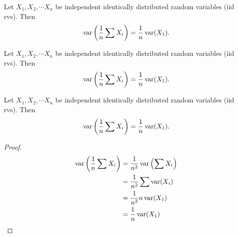 \begin{note}
  \begin{field}
    \begin{cor}
     Let $X_1, X_2, \cdots X_n$ be independent identically distributed random variables (iid rvs). Then
     \[
       \operatorname{var}\left(\frac{1}{n}\sum X_i\right) = \frac{1}{n}\operatorname{var} (X_1).
     \]
    \end{cor}
  \end{field}
  \begin{field}
    \begin{cor}
     Let $X_1, X_2, \cdots X_n$ be independent identically distributed random variables (iid rvs). Then
     \[
       \operatorname{var}\left(\frac{1}{n}\sum X_i\right) = \frac{1}{n}\operatorname{var} (X_1).
     \]
    \end{cor}
  \end{field}
  \xplain{}%
\end{note}

%
\begin{note}
  \begin{field}
    \begin{cor}
     Let $X_1, X_2, \cdots X_n$ be independent identically distributed random variables (iid rvs). Then
     \[
       \operatorname{var}\left(\frac{1}{n}\sum X_i\right) = \frac{1}{n}\operatorname{var} (X_1).
     \]
    \end{cor}
  \end{field}
  \begin{field}
    \begin{proof}
      \begin{align*}
        \operatorname{var}\left(\frac{1}{n}\sum X_i\right) &= \frac{1}{n^2}\operatorname{var}\left(\sum X_i\right)\\
        &= \frac{1}{n^2}\sum \operatorname{var}(X_i)\\
        &= \frac{1}{n^2} n \operatorname{var}(X_1)\\
        &= \frac{1}{n}\operatorname{var} (X_1)
      \end{align*}
    \end{proof}
  \end{field}
  \xplain{}%
\end{note}

